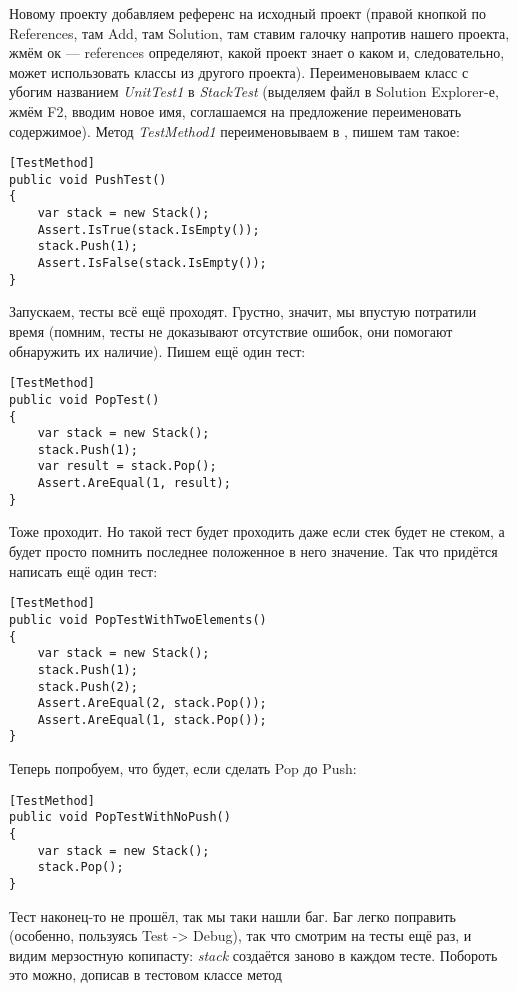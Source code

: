 \documentclass{../../text-style}
\begin{document}
Новому проекту добавляем референс на исходный проект (правой кнопкой по References, там Add, там Solution, там ставим галочку напротив нашего проекта, жмём ок --- references определяют, какой проект знает о каком и, следовательно, может использовать классы из другого проекта). Переименовываем класс с убогим названием \textit{UnitTest1} в \textit{StackTest} (выделяем файл в Solution Explorer-е, жмём F2, вводим новое имя, соглашаемся на предложение переименовать содержимое). Метод \textit{TestMethod1} переименовываем в , пишем там такое:

\begin{verbatim}
[TestMethod]
public void PushTest()
{
    var stack = new Stack();
    Assert.IsTrue(stack.IsEmpty());
    stack.Push(1);
    Assert.IsFalse(stack.IsEmpty());
}
\end{verbatim}

Запускаем, тесты всё ещё проходят. Грустно, значит, мы впустую потратили время (помним, тесты не доказывают отсутствие ошибок, они помогают обнаружить их наличие). Пишем ещё один тест:

\begin{verbatim}
[TestMethod]
public void PopTest()
{
    var stack = new Stack();
    stack.Push(1);
    var result = stack.Pop();
    Assert.AreEqual(1, result);
}
\end{verbatim}

Тоже проходит. Но такой тест будет проходить даже если стек будет не стеком, а будет просто помнить последнее положенное в него значение. Так что придётся написать ещё один тест:

\begin{verbatim}
[TestMethod]
public void PopTestWithTwoElements()
{
    var stack = new Stack();
    stack.Push(1);
    stack.Push(2);
    Assert.AreEqual(2, stack.Pop());
    Assert.AreEqual(1, stack.Pop());
}
\end{verbatim}

Теперь попробуем, что будет, если сделать Pop до Push:

\begin{verbatim}
[TestMethod]
public void PopTestWithNoPush()
{
    var stack = new Stack();
    stack.Pop();
}
\end{verbatim}

Тест наконец-то не прошёл, так мы таки нашли баг. Баг легко поправить (особенно, пользуясь Test -> Debug), так что смотрим на тесты ещё раз, и видим мерзостную копипасту: \textit{stack} создаётся заново в каждом тесте. Побороть это можно, дописав в тестовом классе метод 
\end{document}
